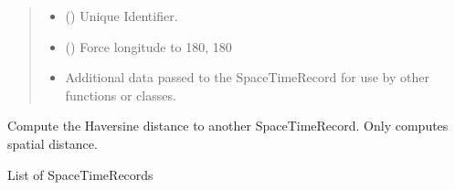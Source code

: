 \documentclass[letterpaper,10pt,english]{sphinxmanual}
\begin{document}
\begin{fulllineitems}
\begin{quote}
\begin{description}
\begin{itemize}
\item {} 
\sphinxAtStartPar
{} (\sphinxstyleliteralemphasis{\sphinxupquote{ | }}) \textendash{} Unique Identifier.

\item {} 
\sphinxAtStartPar
{} () \textendash{} Force longitude to \sphinxhyphen{}180, 180

\item {} 
\sphinxAtStartPar
{} \textendash{} Additional data passed to the SpaceTimeRecord for use by other functions
or classes.

\end{itemize}

\end{description}\end{quote}

\begin{fulllineitems}
\label{\detokenize{users_guide:GeoSpatialTools.octtree.SpaceTimeRecord.distance}}
\pysigstartsignatures
\pysiglinewithargsret
{}
{}
{}
\pysigstopsignatures
\sphinxAtStartPar
Compute the Haversine distance to another SpaceTimeRecord.
Only computes spatial distance.
\begin{quote}\begin{description}
\sphinxAtStartPar
{}

\end{description}\end{quote}

\end{fulllineitems}


\end{fulllineitems}


\begin{fulllineitems}
\label{\detokenize{users_guide:GeoSpatialTools.octtree.SpaceTimeRecords}}
\pysigstartsignatures
\pysiglinewithargsret
{}
{\sphinxparamcomma {}}
{}
\pysigstopsignatures
\sphinxAtStartPar
List of SpaceTimeRecords

\end{fulllineitems}
\end{document}
